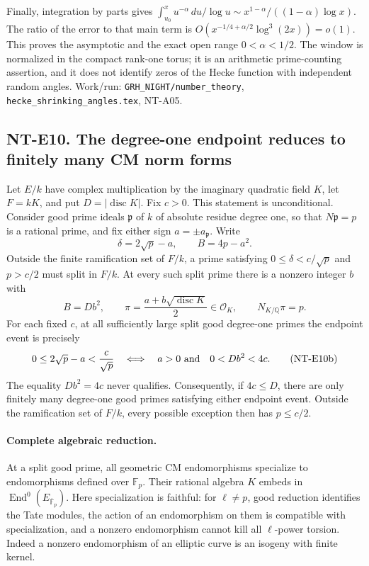 Finally, integration by parts gives
$\int_{u_0}^x u^{-\alpha}\,du/\log u
\sim x^{1-\alpha}/((1-\alpha)\log x)$.
The ratio of the error to that main term is
$O(x^{-1/4+\alpha/2}\log^3(2x))=o(1)$.
This proves the asymptotic and the exact open range
$0<\alpha<1/2$. The window is normalized in the compact rank-one
torus; it is an arithmetic prime-counting assertion, and it does
not identify zeros of the Hecke function with independent random
angles. Work/run: \texttt{GRH\_NIGHT/number\_theory},
\texttt{hecke\_shrinking\_angles.tex}, NT-A05.

\subsection*{NT-E10. The degree-one endpoint reduces to finitely many CM norm forms}
Let $E/k$ have complex multiplication by the imaginary quadratic
field $K$, let $F=kK$, and put $D=|\operatorname{disc}K|$.
Fix $c>0$. This statement is unconditional. Consider good prime
ideals $\mathfrak p$ of $k$ of absolute residue degree one, so that
$N\mathfrak p=p$ is a rational prime, and fix either sign
$a=\pm a_{\mathfrak p}$. Write
\[
 \delta=2\sqrt p-a,\qquad B=4p-a^2 .
\]
Outside the finite ramification set of $F/k$, a prime satisfying
$0\le\delta<c/\sqrt p$ and $p>c/2$ must split in $F/k$.
At every such split prime there is a nonzero integer $b$ with
\[
 B=Db^2,\qquad
 \pi=\frac{a+b\sqrt{\operatorname{disc}K}}2\in\mathcal O_K,\qquad
 N_{K/\mathbb Q}\pi=p.                                  \tag{NT-E10a}
\]
For each fixed $c$, at all sufficiently large split good
degree-one primes the endpoint event is precisely
\[
 0\le2\sqrt p-a<\frac c{\sqrt p}
 \quad\Longleftrightarrow\quad
 a>0\ \hbox{and}\quad 0<Db^2<4c.                        \tag{NT-E10b}
\]
The equality $Db^2=4c$ never qualifies. Consequently, if $4c\le D$,
there are only finitely many degree-one good primes satisfying
either endpoint event. Outside the ramification set of $F/k$,
every possible exception then has $p\le c/2$.

\paragraph{Complete algebraic reduction.}
At a split good prime, all geometric CM endomorphisms specialize
to endomorphisms defined over $\mathbb F_p$. Their rational algebra
$K$ embeds in $\operatorname{End}^0(E_{\overline{\mathbb F}_p})$.
Here specialization is faithful: for $\ell\ne p$, good reduction
identifies the Tate modules, the action of an endomorphism on them
is compatible with specialization, and a nonzero endomorphism
cannot kill all $\ell$-power torsion. Indeed a nonzero endomorphism
of an elliptic curve is an isogeny with finite kernel.

